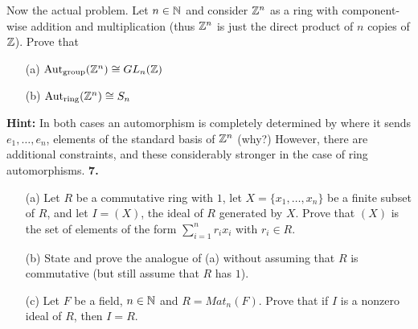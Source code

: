 \documentclass[12pt]{amsart}
\begin{document}
Now the actual problem. Let $n\in{\mathbb N}$ and consider ${\mathbb Z}^n$ as a ring with component-wise addition and multiplication (thus ${\mathbb Z}^n$
is just the direct product of $n$ copies of ${\mathbb Z}$). Prove that
\begin{itemize}
\item[(a)] ${\rm Aut}_{\rm group}({\mathbb Z}^n)\cong GL_n({\mathbb Z})$
\item[(b)] ${\rm Aut}_{\rm ring}({\mathbb Z}^n)\cong S_n$
\end{itemize}
{\bf Hint:} In both cases an automorphism is completely determined by where it sends $e_1,\ldots, e_n$, elements of the standard basis
of ${\mathbb Z}^n$ (why?) However, there are additional constraints, and these considerably stronger in the case of ring automorphisms.
\skv
{\bf 7.} 
\begin{itemize}
\item[(a)] Let $R$ be a commutative ring with $1$, let $X=\{x_1,\ldots, x_n\}$ be a finite subset of $R$, and 
let $I=(X)$, the ideal of $R$ generated by $X$. Prove that $(X)$ is the set of elements of the form $\sum_{i=1}^n r_i x_i$ with $r_i\in R$.
\item[(b)] State and prove the analogue of (a) without assuming that $R$ is commutative (but still assume that $R$ has $1$).
\item[(c)] Let $F$ be a field, $n\in{\mathbb N}$ and $R=Mat_n(F)$. Prove that if $I$ is a nonzero ideal of $R$, then $I=R$.
\end{itemize}


 
\end{document}
